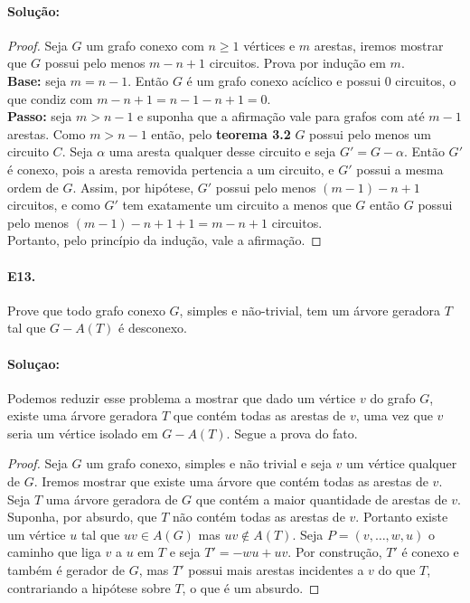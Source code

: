 \documentclass[11pt,a4paper,notitlepage]{exam}
\begin{document}
\paragraph{Solução:}
\begin{proof}
  Seja $G$ um grafo conexo com $n \geq 1$ vértices e $m$ arestas, iremos mostrar que $G$ possui pelo menos $m - n + 1$ circuitos. Prova por indução em $m$.\\
  \textbf{Base:} seja $m = n-1$. Então $G$ é um grafo conexo acíclico e possui $0$ circuitos, o que condiz com $m - n + 1 = n - 1 - n + 1 = 0$.\\
  \textbf{Passo:} seja $m > n-1$ e suponha que a afirmação vale para grafos com até $m-1$ arestas. Como $m >n-1$ então, pelo \textbf{teorema 3.2} $G$ possui pelo menos um circuito $C$. Seja $\alpha$ uma aresta qualquer desse circuito e seja $G' = G - \alpha$. Então $G'$ é conexo, pois a aresta removida pertencia a um circuito, e $G'$ possui a mesma ordem de $G$. Assim, por hipótese, $G'$ possui pelo menos $(m-1) -n +1$ circuitos, e como $G'$ tem exatamente um circuito a menos que $G$ então $G$ possui pelo menos $(m-1) -n + 1 + 1 = m -n + 1$ circuitos.\\
  Portanto, pelo princípio da indução, vale a afirmação.

\end{proof}
\newpage

\paragraph{E13.} Prove que todo grafo conexo $G$, simples e não-trivial, tem um árvore geradora $T$ tal que $G - A(T)$ é desconexo.
\paragraph{Soluçao: }
Podemos reduzir esse problema a mostrar que dado um vértice $v$ do grafo $G$, existe uma árvore geradora $T$ que contém todas as arestas de $v$, uma vez que $v$ seria um vértice isolado em $G - A(T)$. Segue a prova do fato.
\begin{proof}
  Seja $G$ um grafo conexo, simples e não trivial e seja $v$ um vértice qualquer de $G$. Iremos mostrar que existe uma árvore que contém todas as arestas de $v$. Seja $T$ uma árvore geradora de $G$ que contém a maior quantidade de arestas de $v$. Suponha, por absurdo, que $T$ não contém todas as arestas de $v$. Portanto existe um vértice $u$ tal que $uv \in A(G)$ mas $uv \notin A(T)$. Seja $P = (v, \dots, w, u)$ o caminho que liga $v$ a $u$ em $T$ e seja $T' = - wu + uv$. Por construção, $T'$ é conexo e também é gerador de $G$, mas $T'$ possui mais arestas incidentes a $v$ do que $T$, contrariando a hipótese sobre $T$, o que é um absurdo.
\end{proof}
\end{document}
